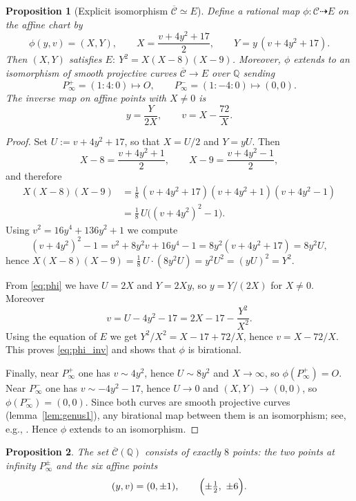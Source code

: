 \documentclass[12pt]{article}
\newtheorem{proposition}{Proposition}
\theoremstyle{remark}
\theoremstyle{definition}
\begin{document}
\begin{proposition}[Explicit isomorphism $\overline{\mathcal{C}}\simeq E$]\label{prop:CEiso}
Define a rational map $\phi:\mathcal{C}\dashrightarrow E$ on the affine chart by
\begin{equation}\label{eq:phi}
\phi(y,v)=(X,Y),\qquad
X=\frac{v+4y^2+17}{2},\qquad
Y=y\,(v+4y^2+17).
\end{equation}
Then $(X,Y)$ satisfies $E:\ Y^2=X(X-8)(X-9)$. Moreover, $\phi$ extends to an isomorphism of smooth projective curves $\overline{\mathcal{C}}\to E$ over $\mathbb{Q}$ sending
\[
P_\infty^+=(1:4:0)\longmapsto O,\qquad
P_\infty^-=(1:-4:0)\longmapsto (0,0).
\]
The inverse map on affine points with $X\neq0$ is
\begin{equation}\label{eq:phi_inv}
y=\frac{Y}{2X},\qquad v=X-\frac{72}{X}.
\end{equation}
\end{proposition}

\begin{proof}
Set $U:=v+4y^2+17$, so that $X=U/2$ and $Y=yU$.
Then
\[
X-8=\frac{v+4y^2+1}{2},\qquad X-9=\frac{v+4y^2-1}{2},
\]
and therefore
\begin{align*}
X(X-8)(X-9)
&=\frac18\,(v+4y^2+17)(v+4y^2+1)(v+4y^2-1)\\
&=\frac18\,U\bigl((v+4y^2)^2-1\bigr).
\end{align*}
Using $v^2=16y^4+136y^2+1$ we compute
\[
(v+4y^2)^2-1=v^2+8y^2v+16y^4-1
=8y^2(v+4y^2+17)=8y^2U,
\]
hence $X(X-8)(X-9)=\frac18\,U\cdot(8y^2U)=y^2U^2=(yU)^2=Y^2$.

From \eqref{eq:phi} we have $U=2X$ and $Y=2Xy$, so $y=Y/(2X)$ for $X\neq0$.
Moreover
\[
v=U-4y^2-17=2X-17-\frac{Y^2}{X^2}.
\]
Using the equation of $E$ we get $Y^2/X^2=X-17+72/X$, hence $v=X-72/X$.
This proves \eqref{eq:phi_inv} and shows that $\phi$ is birational.

Finally, near $P_\infty^+$ one has $v\sim 4y^2$, hence $U\sim 8y^2$ and $X\to\infty$, so $\phi(P_\infty^+)=O$.
Near $P_\infty^-$ one has $v\sim -4y^2-17$, hence $U\to0$ and $(X,Y)\to(0,0)$, so $\phi(P_\infty^-)=(0,0)$.
Since both curves are smooth projective curves (lemma~\ref{lem:genus1}), any birational map between them is an isomorphism; see, e.g., \cite[Ch.~I, \S6]{HartshorneAG}. Hence $\phi$ extends to an isomorphism.
\end{proof}

\begin{proposition}\label{prop:Cpoints}
The set $\overline{\mathcal{C}}(\mathbb{Q})$ consists of exactly $8$ points: the two points at infinity $P_\infty^\pm$ and the six affine points
\[
(y,v)=(0,\pm1),\qquad \Bigl(\pm\tfrac12,\ \pm6\Bigr).
\]
\end{proposition}
\end{document}
